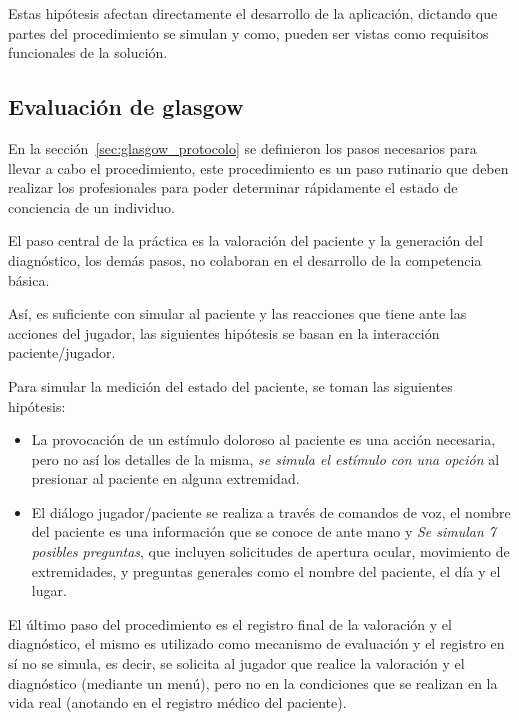 Estas hipótesis afectan directamente el desarrollo de la aplicación, dictando
que partes del procedimiento se simulan y como, pueden ser vistas como
requisitos funcionales de la solución.

\subsection{Evaluación de glasgow}
\label{sec:glasgow_hipotesis}


En la sección~\ref{sec:glasgow_protocolo} se definieron los pasos necesarios
para llevar a cabo el procedimiento, este procedimiento es un paso rutinario que
deben realizar los profesionales para poder determinar rápidamente el estado de
conciencia de un individuo. 

El paso central de la práctica es la valoración del paciente y la generación del
diagnóstico, los demás pasos, no colaboran en el desarrollo de la competencia
básica.

Así, es suficiente con simular al paciente y las reacciones que tiene ante las
acciones del jugador, las siguientes hipótesis se basan en la interacción
paciente/jugador.

Para simular la medición del estado del paciente, se toman las siguientes
hipótesis:

\begin{itemize}
    \item La provocación de un estímulo doloroso al paciente es una acción
        necesaria, pero no así los detalles de la misma, \emph{se simula el
            estímulo con una opción} al presionar al paciente en alguna
        extremidad.
    \item El diálogo jugador/paciente se realiza a través de comandos de voz, el
        nombre del paciente es una información que se conoce de ante mano y
        \emph{Se simulan 7 posibles preguntas}, que incluyen solicitudes de
        apertura ocular, movimiento de extremidades, y preguntas generales como
        el nombre del paciente, el día y el lugar.
\end{itemize}

El último paso del procedimiento es el registro final de la valoración y el
diagnóstico, el mismo es utilizado como mecanismo de evaluación y el registro en
sí no se simula, es decir, se solicita al jugador que realice la valoración y el
diagnóstico (mediante un menú), pero no en la condiciones que se realizan en la
vida real (anotando en el registro médico del paciente).

